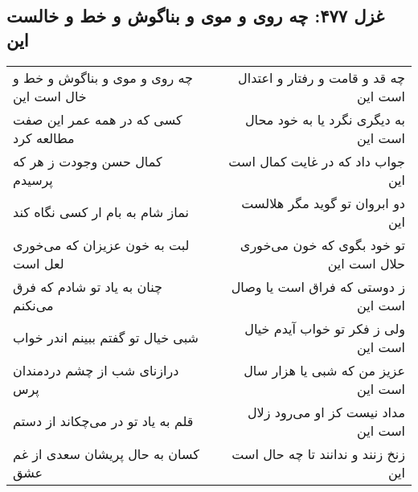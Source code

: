 \begin{center}
\section*{غزل ۴۷۷: چه روی و موی و بناگوش و خط و خالست این}
\label{sec:477}
\begin{longtable}{l p{0.5cm} r}
چه روی و موی و بناگوش و خط و خال است این
&&
چه قد و قامت و رفتار و اعتدال است این
\\
کسی که در همه عمر این صفت مطالعه کرد
&&
به دیگری نگرد یا به خود محال است این
\\
کمال حسن وجودت ز هر که پرسیدم
&&
جواب داد که در غایت کمال است این
\\
نماز شام به بام ار کسی نگاه کند
&&
دو ابروان تو گوید مگر هلالست این
\\
لبت به خون عزیزان که می‌خوری لعل است
&&
تو خود بگوی که خون می‌خوری حلال است این
\\
چنان به یاد تو شادم که فرق می‌نکنم
&&
ز دوستی که فراق است یا وصال است این
\\
شبی خیال تو گفتم ببینم اندر خواب
&&
ولی ز فکر تو خواب آیدم خیال است این
\\
درازنای شب از چشم دردمندان پرس
&&
عزیز من که شبی یا هزار سال است این
\\
قلم به یاد تو در می‌چکاند از دستم
&&
مداد نیست کز او می‌رود زلال است این
\\
کسان به حال پریشان سعدی از غم عشق
&&
زنخ زنند و ندانند تا چه حال است این
\\
\end{longtable}
\end{center}
